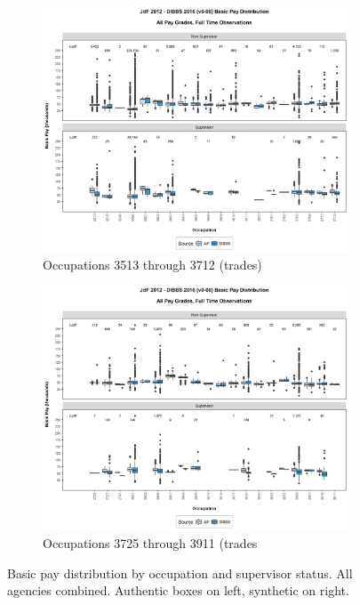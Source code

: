 \documentclass[10pt, letterpaper]{article}
\begin{document}
\begin{spacing}{1.0}
\clearpage

\begin{figure}[h]
    \centering
    \begin{subfigure}{1\textwidth}
        \centering
        \includegraphics[width=6in, trim={0 1in 0 0.75in}, clip]{JdFDIBBSBasicPaySupervisoryStatusOccupation521.png}
        \caption{Occupations 3513 through 3712 (trades)}
        \vspace{10pt}
    \end{subfigure}
    \begin{subfigure}{1\textwidth}
        \centering
        \includegraphics[width=6in, trim={0 1in 0 0.75in}, clip]{JdFDIBBSBasicPaySupervisoryStatusOccupation541.png}
        \caption{Occupations 3725 through 3911 (trades}
        \vspace{10pt}
    \end{subfigure}
    \caption{Basic pay distribution by occupation and supervisor status.  All agencies combined.  Authentic boxes on left, synthetic on right.}
    \label{figure:JdFDIBBSBasicPaySupervisoryStatusOccupation5}
\end{figure}


\end{spacing}
\end{document}
